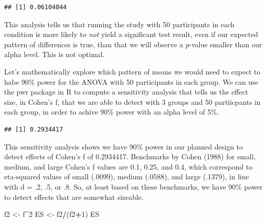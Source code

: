 \documentclass[]{book}
\newenvironment{Shaded}{\begin{snugshade}}{\end{snugshade}}
\newcommand{\CommentTok}[1]{\textcolor[rgb]{0.56,0.35,0.01}{\textit{#1}}}
\newcommand{\DataTypeTok}[1]{\textcolor[rgb]{0.13,0.29,0.53}{#1}}
\newcommand{\DecValTok}[1]{\textcolor[rgb]{0.00,0.00,0.81}{#1}}
\newcommand{\FloatTok}[1]{\textcolor[rgb]{0.00,0.00,0.81}{#1}}
\newcommand{\KeywordTok}[1]{\textcolor[rgb]{0.13,0.29,0.53}{\textbf{#1}}}
\newcommand{\NormalTok}[1]{#1}
\newcommand{\OperatorTok}[1]{\textcolor[rgb]{0.81,0.36,0.00}{\textbf{#1}}}
\newcommand{\StringTok}[1]{\textcolor[rgb]{0.31,0.60,0.02}{#1}}
\begin{document}
\begin{verbatim}
## [1] 0.06104044
\end{verbatim}

This analysis tells us that running the study with 50 participants in each condition is more likely to \emph{not} yield a significant test result, even if our expected pattern of differences is true, than that we will observe a \emph{p}-value smaller than our alpha level. This is not optimal.

Let's mathematically explore which pattern of means we would need to expect to habe 90\% power for the ANOVA with 50 participants in each group. We can use the pwr package in R to compute a sensitivity analysis that tells us the effect size, in Cohen's f, that we are able to detect with 3 groups and 50 partiicpants in each group, in order to achive 90\% power with an alpha level of 5\%.

\begin{Shaded}
\end{Shaded}

\begin{verbatim}
## [1] 0.2934417
\end{verbatim}

This sensitivity analysis shows we have 90\% power in our planned design to detect effects of Cohen's f of 0.2934417. Benchmarks by Cohen (1988) for small, medium, and large Cohen's f values are 0.1, 0.25, and 0.4, which correspond to eta-squared values of small (.0099), medium (.0588), and large (.1379), in line with d = .2, .5, or .8. So, at least based on these benchmarks, we have 90\% power to detect effects that are somewhat sizeable.

\begin{Shaded}
\begin{Highlighting}[]
\NormalTok{f2 <-}\StringTok{ }\NormalTok{f}\OperatorTok{^}\DecValTok{2}
\NormalTok{ES <-}\StringTok{ }\NormalTok{f2}\OperatorTok{/}\NormalTok{(f2}\OperatorTok{+}\DecValTok{1}\NormalTok{)}
\NormalTok{ES}
\end{Highlighting}
\end{Shaded}
\end{document}
